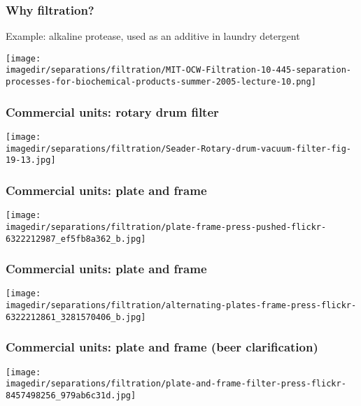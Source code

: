 \begin{frame}\frametitle{Why filtration?}
	Example: alkaline protease, used as an additive in laundry detergent
	\begin{center}
		\texttt{[image: \\imagedir/separations/filtration/MIT-OCW-Filtration-10-445-separation-processes-for-biochemical-products-summer-2005-lecture-10.png]}
	\end{center}
\end{frame}

\begin{frame}\frametitle{Commercial units: rotary drum filter}
	\begin{center}
		\texttt{[image: \\imagedir/separations/filtration/Seader-Rotary-drum-vacuum-filter-fig-19-13.jpg]}
	\end{center}
	\vspace{-6pt}
\end{frame}

\begin{frame}\frametitle{Commercial units: plate and frame}
	\begin{center}
		\texttt{[image: \\imagedir/separations/filtration/plate-frame-press-pushed-flickr-6322212987\_ef5fb8a362\_b.jpg]}
	\end{center}
\end{frame}

\begin{frame}\frametitle{Commercial units: plate and frame}
	\begin{center}
		\texttt{[image: \\imagedir/separations/filtration/alternating-plates-frame-press-flickr-6322212861\_3281570406\_b.jpg]}
	\end{center}
	 
\end{frame}

\begin{frame}\frametitle{Commercial units: plate and frame (beer clarification)}
	\centerline{\texttt{[image: \\imagedir/separations/filtration/plate-and-frame-filter-press-flickr-8457498256\_979ab6c31d.jpg]}}
\end{frame}

